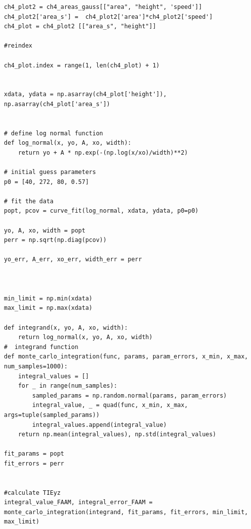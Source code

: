 \documentclass[12pt]{article}
\begin{document}
\begin{lstlisting}
ch4_plot2 = ch4_areas_gauss[["area", "height", 'speed']]
ch4_plot2['area_s'] =  ch4_plot2['area']*ch4_plot2['speed']
ch4_plot = ch4_plot2 [["area_s", "height"]]

#reindex

ch4_plot.index = range(1, len(ch4_plot) + 1)


xdata, ydata = np.asarray(ch4_plot['height']), np.asarray(ch4_plot['area_s'])


# define log normal function
def log_normal(x, yo, A, xo, width):
    return yo + A * np.exp(-(np.log(x/xo)/width)**2)

# initial guess parameters
p0 = [40, 272, 80, 0.57]

# fit the data
popt, pcov = curve_fit(log_normal, xdata, ydata, p0=p0)

yo, A, xo, width = popt
perr = np.sqrt(np.diag(pcov))

yo_err, A_err, xo_err, width_err = perr



min_limit = np.min(xdata)
max_limit = np.max(xdata)

def integrand(x, yo, A, xo, width):
    return log_normal(x, yo, A, xo, width)
#  integrand function
def monte_carlo_integration(func, params, param_errors, x_min, x_max, num_samples=1000):
    integral_values = []
    for _ in range(num_samples):
        sampled_params = np.random.normal(params, param_errors)
        integral_value, _ = quad(func, x_min, x_max, args=tuple(sampled_params))
        integral_values.append(integral_value)
    return np.mean(integral_values), np.std(integral_values)

fit_params = popt
fit_errors = perr


#calculate TIEyz
integral_value_FAAM, integral_error_FAAM = monte_carlo_integration(integrand, fit_params, fit_errors, min_limit, max_limit)


\end{lstlisting}
\end{document}
